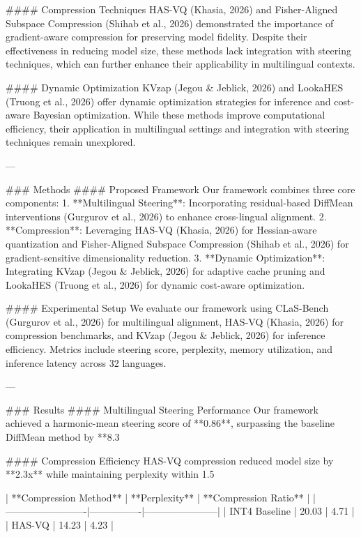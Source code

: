 #### Compression Techniques  
HAS-VQ (Khasia, 2026) and Fisher-Aligned Subspace Compression (Shihab et al., 2026) demonstrated the importance of gradient-aware compression for preserving model fidelity. Despite their effectiveness in reducing model size, these methods lack integration with steering techniques, which can further enhance their applicability in multilingual contexts.

#### Dynamic Optimization  
KVzap (Jegou & Jeblick, 2026) and LookaHES (Truong et al., 2026) offer dynamic optimization strategies for inference and cost-aware Bayesian optimization. While these methods improve computational efficiency, their application in multilingual settings and integration with steering techniques remain unexplored.

---

### Methods  
#### Proposed Framework  
Our framework combines three core components:  
1. **Multilingual Steering**: Incorporating residual-based DiffMean interventions (Gurgurov et al., 2026) to enhance cross-lingual alignment.  
2. **Compression**: Leveraging HAS-VQ (Khasia, 2026) for Hessian-aware quantization and Fisher-Aligned Subspace Compression (Shihab et al., 2026) for gradient-sensitive dimensionality reduction.  
3. **Dynamic Optimization**: Integrating KVzap (Jegou & Jeblick, 2026) for adaptive cache pruning and LookaHES (Truong et al., 2026) for dynamic cost-aware optimization.

#### Experimental Setup  
We evaluate our framework using CLaS-Bench (Gurgurov et al., 2026) for multilingual alignment, HAS-VQ (Khasia, 2026) for compression benchmarks, and KVzap (Jegou & Jeblick, 2026) for inference efficiency. Metrics include steering score, perplexity, memory utilization, and inference latency across 32 languages.

---

### Results  
#### Multilingual Steering Performance  
Our framework achieved a harmonic-mean steering score of **0.86**, surpassing the baseline DiffMean method by **8.3%

#### Compression Efficiency  
HAS-VQ compression reduced model size by **2.3x** while maintaining perplexity within 1.5%

| **Compression Method** | **Perplexity** | **Compression Ratio** |  
|-------------------------|----------------|-----------------------|  
| INT4 Baseline          | 20.03         | 4.71                 |  
| HAS-VQ                 | 14.23         | 4.23                 |  

